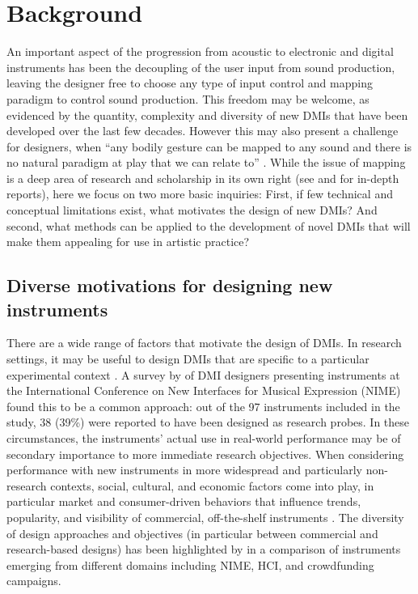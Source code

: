 \documentclass[letterpaper, 12pt]{article}
\begin{document}
\section{Background}
\label{sec:background}

An important aspect of the progression from acoustic to electronic and digital instruments has been the decoupling of the user input from sound production, leaving the designer free to choose any type of input control and mapping paradigm to control sound production. This freedom may be welcome, as evidenced by the quantity, complexity and diversity of new DMIs that have been developed over the last few decades. However this may also present a challenge for designers, when ``any bodily gesture can be mapped to any sound and there is no natural paradigm at play that we can relate to'' \citep*[p. 34]{Magnusson2019}. While the issue of mapping is a deep area of research and scholarship in its own right (see \citet{os-mapping-2002} and \citet{cmj-mapping-2014} for in-depth reports), here we focus on two more basic inquiries: First, if few technical and conceptual limitations exist, what motivates the design of new DMIs? And second, what methods can be applied to the development of novel DMIs that will make them appealing for use in artistic practice? 

\subsection{Diverse motivations for designing new instruments}
\label{sec:diverse-motivations-for-designing-new-instruments}

There are a wide range of factors that motivate the design of DMIs. In research settings, it may be useful to design DMIs that are specific to a particular experimental context \citep{Marquez-borbon2011}. A survey by \citet{Morreale2017} of DMI designers presenting instruments at the International Conference on New Interfaces for Musical Expression (NIME) found this to be a common approach: out of the 97 instruments included in the study, 38 (39\%) were reported to have been designed as research probes. In these circumstances, the instruments' actual use in real-world performance may be of secondary importance to more immediate research objectives. When considering performance with new instruments in more widespread and particularly non-research contexts, social, cultural, and economic factors come into play, in particular market and consumer-driven behaviors that influence trends, popularity, and visibility of commercial, off-the-shelf instruments \citep{Theberge1997}. The diversity of design approaches and objectives (in particular between commercial and research-based designs) has been highlighted by \citet{mcpherson2019musical} in a comparison of instruments emerging from different domains including NIME, HCI, and crowdfunding campaigns. 
\end{document}
